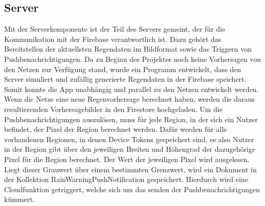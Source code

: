 \subsection{Server}\label{server}
Mit der Serverkomponente ist der Teil des Servers gemeint, der für die Kommunikation mit der Firebase verantwortlich ist. Dazu gehört das Bereitstellen der aktuellsten Regendaten im Bildformat sowie das Triggern von Pushbenachrichtigungen. 
Da zu Beginn des Projektes noch keine Vorhersagen von den Netzen zur Verfügung stand, wurde ein Programm entwickelt, dass den Server simuliert und zufällig generierte Regendaten in der Firebase speichert. Somit konnte die App unabhängig und parallel zu den Netzen entwickelt werden.
Wenn die Netze eine neue Regenvorhersage berechnet haben, werden die daraus resultierenden Vorhersagebilder in den Firestore hochgeladen. 
Um die Pushbenachrichtigungen auszulösen, muss für jede Region, in der sich ein Nutzer befindet, der Pixel der Region berechnet werden. 
Dafür werden für alle vorhandenen Regionen, in denen Device Tokens gespeichert sind, es also Nutzer in der Region gibt über den jeweiligen Breiten und Höhengrad der dazugehörige Pixel für die Region berechnet. Der Wert der jeweiligen Pixel wird ausgelesen. Liegt dieser Grauwert über einem bestimmten Grenzwert, wird ein Dokument in der Kollektion RainWarningPushNotification gespeichert. Hierdurch wird eine Cloudfunktion getriggert, welche sich um das senden der Pushbenachrichtigungen kümmert.